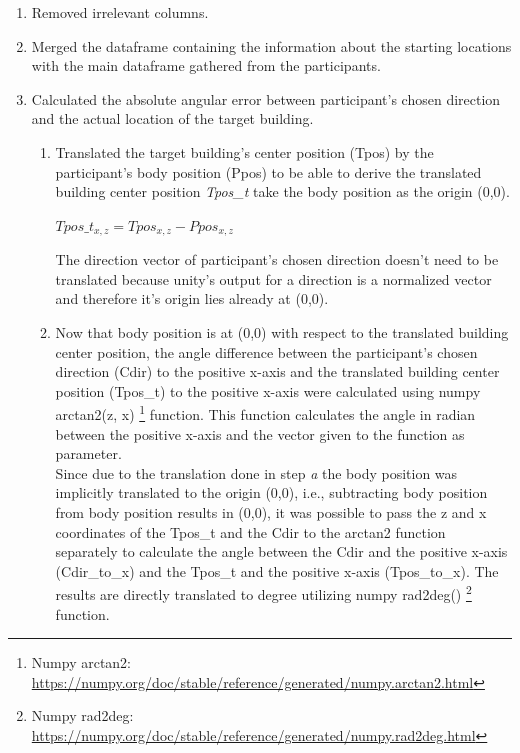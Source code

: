 \begin{enumerate}
	\item Removed irrelevant columns.
	\item Merged the dataframe containing the information about the starting locations with the main dataframe gathered from the participants.
	\item Calculated the absolute angular error between participant's chosen direction and the actual location of the target building.
	
	\begin{enumerate}
		\item Translated the target building's center position {\emphasize(Tpos)} by the participant's body position {\emphasize(Ppos)} to be able to derive the translated building center position {\emph{Tpos\_t}} take the body position as the origin (0,0).
			\begin{center}
				$Tpos\_t_{x,z}= Tpos_{x,z} - Ppos_{x,z}$
			\end{center}
		The direction vector of participant's chosen direction doesn't need to be translated because unity's output for a direction is a normalized vector and therefore it's origin lies already at (0,0).\\
		
		\item Now that body position is at (0,0) with respect to the translated building center position, the angle difference between the participant's chosen direction {\emphasize(Cdir)} to the positive x-axis and the translated building center position {\emphasize(Tpos\_t)} to the positive x-axis were calculated using numpy arctan2(z, x) \footnote{Numpy arctan2: \href{https://numpy.org/doc/stable/reference/generated/numpy.arctan2.html}{https://numpy.org/doc/stable/reference/generated/numpy.arctan2.html}} function. This function calculates the angle in radian between the positive x-axis and the vector given to the function as parameter. \\
		Since due to the translation done in step \emph{a} the body position was implicitly translated to the origin (0,0), i.e., subtracting body position from body position results in (0,0), it was possible to pass the z and x coordinates of the {\emphasize Tpos\_t} and the {\emphasize Cdir} to the arctan2 function separately to calculate the angle between the {\emphasize Cdir} and the positive x-axis {\emphasize (Cdir\_to\_x)} and the {\emphasize Tpos\_t} and the positive x-axis {\emphasize (Tpos\_to\_x)}. The results are directly translated to degree utilizing numpy rad2deg() \footnote{Numpy rad2deg: \href{https://numpy.org/doc/stable/reference/generated/numpy.rad2deg.html}{https://numpy.org/doc/stable/reference/generated/numpy.rad2deg.html}} function.
		

\end{enumerate}
\end{enumerate}
